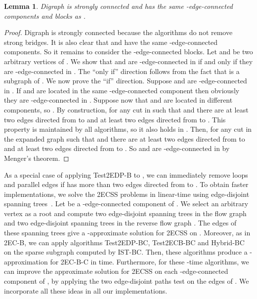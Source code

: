 \documentclass[11pt]{article}
\newtheorem{lemma}[theorem]{Lemma}
\begin{document}
\begin{lemma}
\label{lemma:condensed}
Digraph  is strongly connected and has the same -edge-connected components and blocks as .
\end{lemma}
\begin{proof}
Digraph  is strongly connected because the algorithms do not remove strong bridges. It is also clear that  and  have the same -edge-connected components. So it remains to consider the -edge-connected blocks. Let  and  be two arbitrary vertices of . We show that  and  are -edge-connected in  if and only if they are -edge-connected in .
The ``only if'' direction follows from the fact that  is a subgraph of . We now prove the ``if'' direction. Suppose  and  are -edge-connected in .
If  and  are located in the same -edge-connected component then obviously they are -edge-connected in . Suppose now that  and  are located in different components, so . By construction,  for any  cut in  such that  and  there are at least two edges directed from  to  and at least two edges directed from  to . This property is maintained by all algorithms, so it also holds in .
Then, for any  cut in the expanded graph  such that  and  there are at least two edges directed from  to  and at least two edges directed from  to . So  and  are -edge-connected in  by Menger's theorem.
\end{proof}

As a special case of applying \textsf{Test2EDP-B} to , we can immediately remove loops and parallel edges  if  has more than two edges directed from  to .
To obtain faster implementations,
we solve the \textsf{2ECSS} problems in linear-time using edge-disjoint spanning trees~\cite{edge-disjoint:edmonds,st:t}.
Let  be a -edge-connected component of . We select an arbitrary vertex  as a root and compute two edge-disjoint spanning trees in the flow graph 
and  two edge-disjoint spanning trees in the reverse flow graph . The edges of these spanning trees give a -approximate solution  for \textsf{2ECSS} on .
Moreover, as in \textsf{2EC-B}, we can apply algorithms \textsf{Test2EDP-BC}, \textsf{Test2ECB-BC} and \textsf{Hybrid-BC} on the sparse subgraph computed by \textsf{IST-BC}.
Then, these algorithms produce a -approximation for \textsf{2EC-B-C} in  time. Furthermore, for these -time algorithms, we can improve the approximate solution  for \textsf{2ECSS} on each -edge-connected component  of , by applying
the two edge-disjoint paths test on the edges of .
We incorporate all these ideas in all our implementations.
\end{document}
